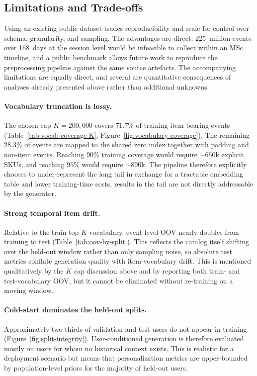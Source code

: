 \documentclass[sigconf,nonacm]{acmart}
\begin{document}
\subsection{Limitations and Trade-offs}
\label{sec:data-limitations}

Using an existing public dataset trades reproducibility and scale for control
over schema, granularity, and sampling. The advantages are direct: 225~million
events over 168~days at the session level would be infeasible to collect within
an MSc timeline, and a public benchmark allows future work to reproduce the
preprocessing pipeline against the same source artefacts. The accompanying
limitations are equally direct, and several are quantitative consequences of
analyses already presented above rather than additional unknowns.

\paragraph{Vocabulary truncation is lossy.}
The chosen cap $K{=}200{,}000$ covers $71.7\%$ of training item-bearing events
(Table~\ref{tab:vocab-coverage-K}, Figure~\ref{fig:vocabulary-coverage}). The
remaining $28.3\%$ of events are mapped to the shared zero index together with
padding and non-item events. Reaching $90\%$ training coverage would require
$\sim\!650$k explicit SKUs, and reaching $95\%$ would require $\sim\!890$k.
The pipeline therefore explicitly chooses to under-represent the long tail in
exchange for a tractable embedding table and lower training-time costs, results in the tail are not directly
addressable by the generator.

\paragraph{Strong temporal item drift.}
Relative to the train top-$K$ vocabulary, event-level OOV nearly doubles from
training to test (Table~\ref{tab:oov-by-split}). This reflects the catalog
itself shifting over the held-out window rather than only sampling noise, so
absolute test metrics conflate generation quality with item-vocabulary drift.
This is mentioned qualitatively by the $K$ cap discussion above and by reporting
both train- and test-vocabulary OOV, but it cannot be eliminated without
re-training on a moving window.

\paragraph{Cold-start dominates the held-out splits.}
Approximately two-thirds of validation and test users do not appear in
training (Figure~\ref{fig:split-integrity}). User-conditioned generation is
therefore evaluated mostly on users for whom no historical context exists. This
is realistic for a deployment scenario but means that personalization metrics
are upper-bounded by population-level priors for the majority of held-out users.
\end{document}
